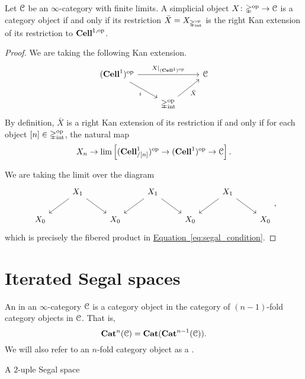 \documentclass[main.tex]{subfiles}
\begin{document}
\begin{lemma}
  Let $\mathcal{C}$ be an $\infty$-category with finite limits. A simplicial object $X\colon \mathbb{\Delta}^{\mathrm{op}} \to \mathcal{C}$ is a category object if and only if its restriction $\bar{X} = X_{\mathbb{\Delta}_{\mathrm{int}}^{\mathrm{op}}}$ is the right Kan extension of its restriction to $\mathbf{Cell}^{1,\mathrm{op}}$.
\end{lemma}
\begin{proof}
  We are taking the following Kan extension.
  \begin{equation*}
    \begin{tikzcd}
      (\Cell^{1})\op
      \arrow[rr, "X|_{(\Cell^{1})\op}"]
      \arrow[dr, swap, "i"]
      && \category{C}
      \\
      & \Dint\op
      \arrow[ur, swap, "\bar{X}"]
    \end{tikzcd}
  \end{equation*}
  By definition, $\bar{X}$ is a right Kan extension of its restriction if and only if for each object $[n] \in \mathbb{\Delta}_{\mathrm{int}}^{\mathrm{op}}$, the natural map
  \begin{equation*}
    X_{n} \to \lim\left[(\mathbf{Cell}^{1}_{/[n]})^{\mathrm{op}} \to (\mathbf{Cell}^{1})^{\mathrm{op}} \to \mathcal{C}\right].
  \end{equation*}

  We are taking the limit over the diagram
  \begin{equation*}
    \begin{tikzcd}
      & X_{1}
      \arrow[dl]
      \arrow[dr]
      & & X_{1}
      \arrow[dl]
      \arrow[dr]
      & & X_{1}
      \arrow[dl]
      \arrow[dr]
      \\
      X_{0}
      && X_{0}
      && X_{0}
      && X_{0}
    \end{tikzcd},
  \end{equation*}
  which is precisely the fibered product in \hyperref[eq:segal_condition]{Equation~\ref*{eq:segal_condition}}.
\end{proof}

\section{Iterated Segal spaces}
\label{sec:iterated_segal_spaces}

\begin{definition}
  \label{def:n-fold_category_object}
  An  in an $\infty$-category $\mathcal{C}$ is a category object in the category of $(n-1)$-fold category objects in $\mathcal{C}$. That is,
  \begin{equation*}
    \mathbf{Cat}^{n}(\mathcal{C}) = \mathbf{Cat}(\mathbf{Cat}^{n-1}(\mathcal{C})).
  \end{equation*}
  We will also refer to an $n$-fold category object as a .
\end{definition}

\begin{example}
  A $2$-uple Segal space
\end{example}
\end{document}
